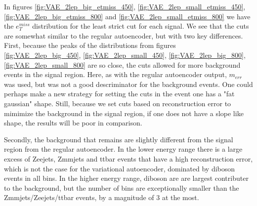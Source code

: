 In figures \ref{fig:VAE_2lep_big_etmiss_450}, \ref{fig:VAE_2lep_small_etmiss_450}, 
\ref{fig:VAE_2lep_big_etmiss_800} and  \ref{fig:VAE_2lep_small_etmiss_800} we have 
the $e_T^{miss}$ distribution for the least strict cut for each signal. We see that 
the cuts are somewhat similar to the regular autoencoder, but with two key differences.
First, because the peaks of the distributions from figures \ref{fig:VAE_2lep_big_450}, 
\ref{fig:VAE_2lep_small_450}, \ref{fig:VAE_2lep_big_800}, \ref{fig:VAE_2lep_small_800} 
are so close, the cuts allowed for more background events in the signal region. Here, 
as with the regular autoencoder output, $m_{err}$ was used, but was not a good descriminator 
for the background events. One could perhaps make a new strategy for setting the cuts in 
the event one has a "fat gaussian" shape. Still, because we set cuts based on reconstruction 
error to mimimize the background in the signal region, if one does not have a slope like shape, 
the results will be poor in comparison. \par 
Secondly, the background that remains are slightly 
different from the signal region from the regular autoencoder. In the lower energy range there 
is a large excess of Zeejets, Zmmjets and ttbar events that have a high reconstruction error, 
which is not the case for the variational autoencoder, dominated by diboson events in all bins. 
In the higher energy range, diboson are are largest contributer to the background, but the number 
of bins are exceptionally smaller than the Zmmjets/Zeejets/ttbar events, by a magnitude of 3 at the most. 


 